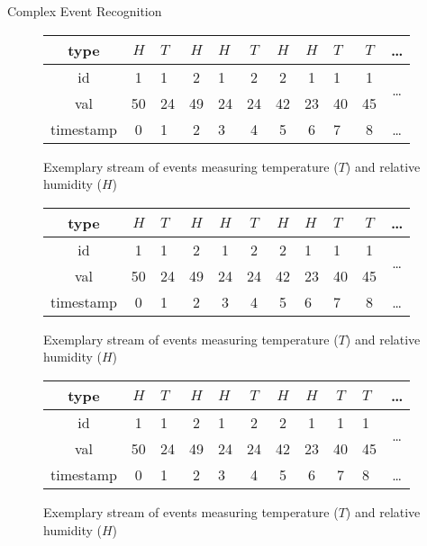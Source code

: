 \documentclass[xcolor=pdftex,dvipsnames,table]{beamer}
\begin{document}
\begin{frame}{Complex Event Recognition}
 \begin{block}{}
    \begin{figure}[H]
      \centering
      \begin{tabular}{|c|c|a|c|a|c|c|c|a|c|c}\hline
        type  &$H$&$T$&$H$&$H$&$T$&$H$&$H$&$T$&$T$ & \ldots \\ \hline
        id  & 1 & 1 & 2 & 1 & 2 & 2 & 1 & 1 & 1 &  \\
        val & 50 & 24& 49& 24& 24& 42& 23& 40& 45\\ \hline
        timestamp & 0 & 1 & 2 & 3 & 4 & 5 & 6 & 7 & 8 & \ldots \\ \hline
      \end{tabular}
      \caption{Exemplary stream of events measuring temperature ($T$) and relative humidity ($H$)}
      \label{fig:stream}
    \end{figure}
 \end{block}

 \begin{block}{}
    \begin{figure}[H]
      \centering
      \begin{tabular}{|c|c|a|c|c|c|c|a|a|c|c}\hline
        type  &$H$&$T$&$H$&$H$&$T$&$H$&$H$&$T$&$T$ & \ldots \\ \hline
        id  & 1 & 1 & 2 & 1 & 2 & 2 & 1 & 1 & 1 &  \\
        val & 50 & 24& 49& 24& 24& 42& 23& 40& 45\\ \hline
        timestamp & 0 & 1 & 2 & 3 & 4 & 5 & 6 & 7 & 8 & \ldots \\ \hline
      \end{tabular}
      \caption{Exemplary stream of events measuring temperature ($T$) and relative humidity ($H$)}
      \label{fig:stream}
    \end{figure}
 \end{block}

 \begin{block}{}
    \begin{figure}[H]
      \centering
      \begin{tabular}{|c|c|a|c|a|c|c|c|c|a|c}\hline
        type  &$H$&$T$&$H$&$H$&$T$&$H$&$H$&$T$&$T$ & \ldots \\ \hline
        id  & 1 & 1 & 2 & 1 & 2 & 2 & 1 & 1 & 1 &  \\
        val & 50 & 24& 49& 24& 24& 42& 23& 40& 45\\ \hline
        timestamp & 0 & 1 & 2 & 3 & 4 & 5 & 6 & 7 & 8 & \ldots \\ \hline
      \end{tabular}
      \caption{Exemplary stream of events measuring temperature ($T$) and relative humidity ($H$)}
      \label{fig:stream}
    \end{figure}
 \end{block}


\end{frame}
\end{document}
